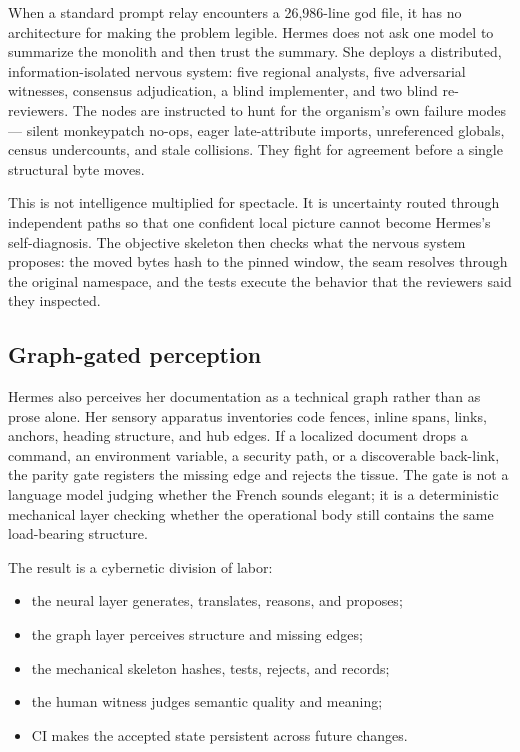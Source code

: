 \documentclass[11pt]{article}
\theoremstyle{definition}
\theoremstyle{plain}
\theoremstyle{remark}
\begin{document}
When a standard prompt relay encounters a 26{,}986-line god file, it has no
architecture for making the problem legible. Hermes does not ask one model to
summarize the monolith and then trust the summary. She deploys a distributed,
information-isolated nervous system: five regional analysts, five adversarial
witnesses, consensus adjudication, a blind implementer, and two blind
re-reviewers. The nodes are instructed to hunt for the organism's own
failure modes --- silent monkeypatch no-ops, eager late-attribute imports,
unreferenced globals, census undercounts, and stale collisions. They fight
for agreement before a single structural byte moves.

This is not intelligence multiplied for spectacle. It is uncertainty routed
through independent paths so that one confident local picture cannot become
Hermes's self-diagnosis. The objective skeleton then checks what the nervous
system proposes: the moved bytes hash to the pinned window, the seam resolves
through the original namespace, and the tests execute the behavior that the
reviewers said they inspected.

\subsection{Graph-gated perception}

Hermes also perceives her documentation as a technical graph rather than as
prose alone. Her sensory apparatus inventories code fences, inline spans,
links, anchors, heading structure, and hub edges. If a localized document
drops a command, an environment variable, a security path, or a discoverable
back-link, the parity gate registers the missing edge and rejects the tissue.
The gate is not a language model judging whether the French sounds elegant;
it is a deterministic mechanical layer checking whether the operational body
still contains the same load-bearing structure.

The result is a cybernetic division of labor:
\begin{itemize}[leftmargin=*]
\item the neural layer generates, translates, reasons, and proposes;
\item the graph layer perceives structure and missing edges;
\item the mechanical skeleton hashes, tests, rejects, and records;
\item the human witness judges semantic quality and meaning;
\item CI makes the accepted state persistent across future changes.
\end{itemize}
\end{document}
